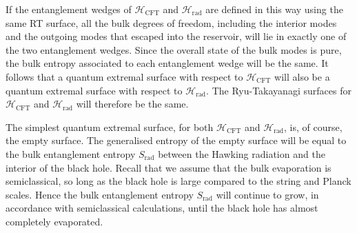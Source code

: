\documentclass[12pt]{article}
\newcommand{\Srad}{S_\text{rad} }
\begin{document}
If the entanglement wedges of $\mathcal{H}_\text{CFT}$ and $\mathcal{H}_\text{rad}$ are defined in this way using the same RT surface, all the bulk degrees of freedom, including the interior modes and the outgoing modes that escaped into the reservoir, will lie in exactly one of the two entanglement wedges. Since the overall state of the bulk modes is pure, the bulk entropy associated to each entanglement wedge will be the same. It follows that a quantum extremal surface with respect to $\mathcal{H}_\text{CFT}$ will also be a quantum extremal surface with respect to $\mathcal{H}_\text{rad}$. The Ryu-Takayanagi surfaces for $\mathcal{H}_\text{CFT}$ and $\mathcal{H}_\text{rad}$ will therefore be the same.

The simplest quantum extremal surface, for both $\mathcal{H}_\text{CFT}$ and $\mathcal{H}_\text{rad}$, is, of course, the empty surface. The generalised entropy of the empty surface will be equal to the bulk entanglement entropy $\Srad$ between the Hawking radiation and the interior of the black hole. Recall that we assume that the bulk evaporation is semiclassical, so long as the black hole is large compared to the string and Planck scales. Hence the bulk entanglement entropy $\Srad$ will continue to grow, in accordance with semiclassical calculations,  until the black hole has almost completely evaporated.
\end{document}
